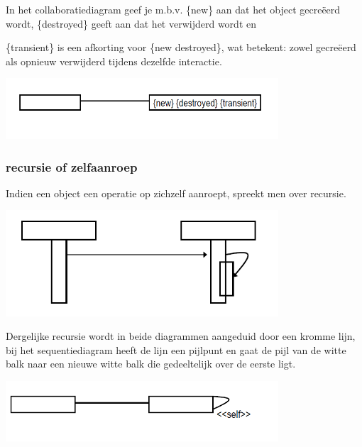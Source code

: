 In het collaboratiediagram geef je m.b.v. \big\{new\big\} aan dat het object gecreëerd wordt, \big\{destroyed\big\} geeft aan dat het verwijderd wordt en {\big\{transient\big\} is een afkorting voor \big\{new destroyed\big\}, wat betekent: zowel gecreëerd als opnieuw verwijderd tijdens dezelfde interactie.


\begin{center}
\includegraphics[width=4in]{img/destr2}%
\end{center}

\subsubsection{recursie of zelfaanroep}

Indien een object een operatie op zichzelf aanroept, spreekt men over recursie.


\begin{center}
\includegraphics[width=4in]{img/rec1}%
\end{center}

Dergelijke recursie wordt in beide diagrammen aangeduid door een kromme lijn, bij het sequentiediagram heeft de lijn een pijlpunt en gaat de pijl van de witte balk naar een nieuwe witte balk die gedeeltelijk over de eerste ligt.


\begin{center}
\includegraphics[width=4in]{img/rec2}%
\end{center}

}
